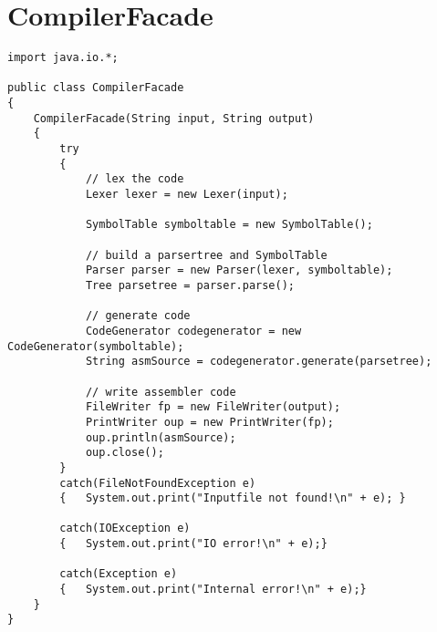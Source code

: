 \chapter{CompilerFacade}
\label{a:compilerfacade}
\OverviewLineNoTitle
\begin{footnotesize}\begin{verbatim}
import java.io.*;

public class CompilerFacade
{
    CompilerFacade(String input, String output)
    {
        try
        {
            // lex the code
            Lexer lexer = new Lexer(input);

            SymbolTable symboltable = new SymbolTable();

            // build a parsertree and SymbolTable
            Parser parser = new Parser(lexer, symboltable);
            Tree parsetree = parser.parse();

            // generate code
            CodeGenerator codegenerator = new CodeGenerator(symboltable);
            String asmSource = codegenerator.generate(parsetree);

            // write assembler code
            FileWriter fp = new FileWriter(output);
            PrintWriter oup = new PrintWriter(fp);
            oup.println(asmSource);
            oup.close();
        }
        catch(FileNotFoundException e)
        {   System.out.print("Inputfile not found!\n" + e); }

        catch(IOException e)
        {   System.out.print("IO error!\n" + e);}

        catch(Exception e)
        {   System.out.print("Internal error!\n" + e);}
    }
}
\end{verbatim}\end{footnotesize}

